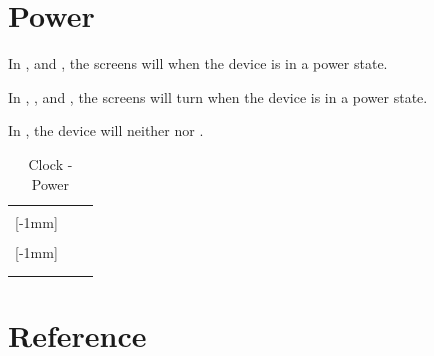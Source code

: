 \section{Power}

In ,  and , the screens will  when the device
is in a  power state.

\par\medskip

In , ,  and , the screens will turn 
when the device is in a  power state.

\par\medskip

In , the device will neither  nor .

\begin{table}[H]
  \begin{tabu}{ X[1,c,m] | X[1,c,m] | X[1,c,m] }
  \thrule
   &  &  \\ \mrule

  [-1mm]{} 
    &    &  \\ 
  &   &  \\ \mrule

  [-1mm]{} 
    &    \newline {}
    &  \\ 
  &  &  \\

  \bhrule
  \end{tabu}
\caption {Clock - Power}
\end{table}

\section{Reference} \label{Clock - Reference}

